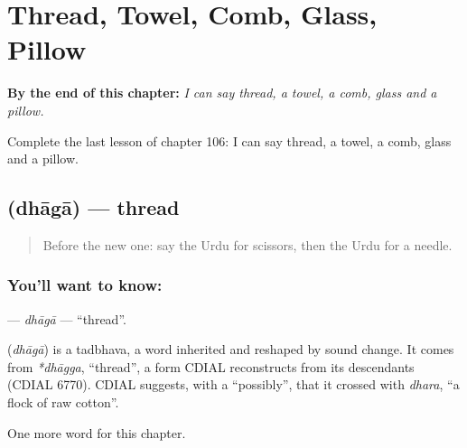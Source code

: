 
\chapter{Thread, Towel, Comb, Glass, Pillow}
\label{ch:ur-thread-towel-comb-glass-pillow}

\begin{chapteropening}
\textbf{By the end of this chapter:} \emph{I can say thread, a towel, a comb, glass and a pillow.}

Complete the last lesson of chapter 106: I can say thread, a towel, a comb, glass and a pillow.
\end{chapteropening}

\section[\texorpdfstring{\ur{دھاگا} (dhāgā)}{دھاگا (dhāgā)}]{ (dhāgā) — thread}

\label{lesson:UR-C106-dhaga}



\begin{quote}
Before the new one: say the Urdu for scissors, then the Urdu for a needle.
\end{quote}

\subsection*{You'll want to know: }
\textbf{} — \emph{dhāgā} — \textquotedblleft{}thread\textquotedblright{}.

\begin{cousinweb}
\textbf{} (\emph{dhāgā}) is a tadbhava, a word inherited and reshaped by sound change. It comes from \emph{*dhāgga}, \textquotedblleft{}thread\textquotedblright{}, a form CDIAL reconstructs from its descendants (CDIAL 6770). CDIAL suggests, with a \textquotedblleft{}possibly\textquotedblright{}, that it crossed with \emph{dhara}, \textquotedblleft{}a flock of raw cotton\textquotedblright{}.
\end{cousinweb}

\begin{grammarlens}[title={What you've built}]
One more word for this chapter.
\end{grammarlens}


